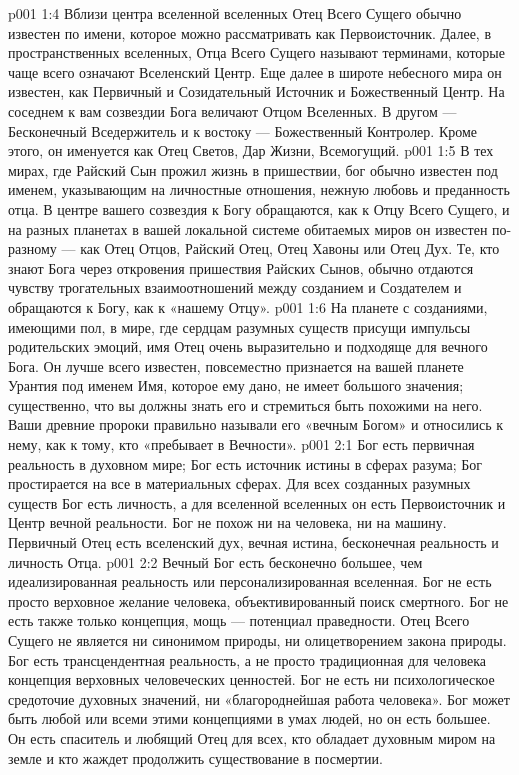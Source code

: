 \vs p001 1:4 \pc Вблизи центра вселенной вселенных Отец Всего Сущего обычно известен по имени, которое можно рассматривать как Первоисточник. Далее, в пространственных вселенных, Отца Всего Сущего называют терминами, которые чаще всего означают Вселенский Центр. Еще далее в широте небесного мира он известен, как Первичный и Созидательный Источник и Божественный Центр. На соседнем к вам созвездии Бога величают Отцом Вселенных. В другом --- Бесконечный Вседержитель и к востоку --- Божественный Контролер. Кроме этого, он именуется как Отец Светов, Дар Жизни, Всемогущий.
\vs p001 1:5 В тех мирах, где Райский Сын прожил жизнь в пришествии, бог обычно известен под именем, указывающим на личностные отношения, нежную любовь и преданность отца. В центре вашего созвездия к Богу обращаются, как к Отцу Всего Сущего, и на разных планетах в вашей локальной системе обитаемых миров он известен по\hyp{}разному --- как Отец Отцов, Райский Отец, Отец Хавоны или Отец Дух. Те, кто знают Бога через откровения пришествия Райских Сынов, обычно отдаются чувству трогательных взаимоотношений между созданием и Создателем и обращаются к Богу, как к «нашему Отцу».
\vs p001 1:6 На планете с созданиями, имеющими пол, в мире, где сердцам разумных существ присущи импульсы родительских эмоций, имя Отец очень выразительно и подходяще для вечного Бога. Он лучше всего известен, повсеместно признается на вашей планете Урантия под именем  Имя, которое ему дано, не имеет большого значения; существенно, что вы должны знать его и стремиться быть похожими на него. Ваши древние пророки правильно называли его «вечным Богом» и относились к нему, как к тому, кто «пребывает в Вечности».
\vs p001 2:1 Бог есть первичная реальность в духовном мире; Бог есть источник истины в сферах разума; Бог простирается на все в материальных сферах. Для всех созданных разумных существ Бог есть личность, а для вселенной вселенных он есть Первоисточник и Центр вечной реальности. Бог не похож ни на человека, ни на машину. Первичный Отец есть вселенский дух, вечная истина, бесконечная реальность и личность Отца.
\vs p001 2:2 \pc Вечный Бог есть бесконечно большее, чем идеализированная реальность или персонализированная вселенная. Бог не есть просто верховное желание человека, объективированный поиск смертного. Бог не есть также только концепция, мощь --- потенциал праведности. Отец Всего Сущего не является ни синонимом природы, ни олицетворением закона природы. Бог есть трансцендентная реальность, а не просто традиционная для человека концепция верховных человеческих ценностей. Бог не есть ни психологическое средоточие духовных значений, ни «благороднейшая работа человека». Бог может быть любой или всеми этими концепциями в умах людей, но он есть большее. Он есть спаситель и любящий Отец для всех, кто обладает духовным миром на земле и кто жаждет продолжить существование в посмертии.

